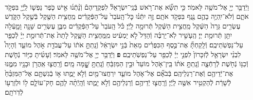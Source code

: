 \documentclass[twoside, openany, parskip=half, 11pt]{book}
\begin{document}
\begin{footnotesize}
\begin{multicols}{2}
\\
וַיְֿדַבֵּ֥ר יְיָ֖ אֶל־מֹשֶׁ֥ה לֵּאמֹֽר׃ כִּ֣י תִשָּׂ֞א אֶת־רֹ֥אשׁ בְּֿנֵֽי־יִשְׂרָאֵל֘ לִפְקֻֽדֵיהֶם֒ וְֿנָ֨תְֿנ֜וּ אִ֣ישׁ כֹּ֧פֶר נַפְשׁ֛וֹ לַֽיְֿיָ֖ בִּפְקֹ֣ד אֹתָ֑ם וְֿלֹא־יִֽהְיֶ֥ה בָהֶ֛ם נֶ֖גֶף בִּפְקֹ֥ד אֹתָֽם׃ זֶ֣ה יִתְּֿנ֗וּ כׇּל־הָֽעֹבֵר֙ עַל־הַפְּֿקֻדִ֔ים מַֽחֲצִ֥ית הַשֶּׁ֖קֶל בְּֿשֶׁ֣קֶל הַקֹּ֑דֶשׁ עֶשְׂרִ֤ים גֵּרָה֙ הַשֶּׁ֔קֶל מַֽחֲצִ֣ית הַשֶּׁ֔קֶל תְּֿרוּמָ֖ה לַֽיְֿיָ׃  כֹּ֗ל הָֽעֹבֵר֙ עַל־הַפְּֿקֻדִ֔ים מִבֶּ֛ן עֶשְׂרִ֥ים שָׁנָ֖ה וָמָ֑עְֿלָה יִתֵּ֖ן תְּֿרוּמַ֥ת יְיָ׃ הֶֽעָשִׁ֣יר לֹֽא־יַרְבֶּ֗ה וְֿהַדַּל֙ לֹ֣א יַמְעִ֔יט מִֽמַּֽחֲצִ֖ית הַשָּׁ֑קֶל לָתֵת֙ אֶת־תְּֿרוּמַ֣ת יְיָ֔ לְֿכַפֵּ֖ר עַל־נַפְשֹֽׁתֵיכֶֽם׃ וְֿלָֽקַחְתָּ֞ אֶת־כֶּ֣סֶף הַכִּפֻּרִ֗ים מֵאֵת֙ בְּֿנֵ֣י יִשְׂרָאֵ֔ל וְֿנָֽתַתָּ֣ אֹת֔וֹ עַל־עֲבֹדַ֖ת אֹ֣הֶל מוֹעֵ֑ד וְֿהָיָה֩ לִבְנֵ֨י יִשְׂרָאֵ֤ל לְֿזִכָּרוֹן֙ לִפְנֵ֣י יְיָ֔ לְֿכַפֵּ֖ר עַל־נַפְשֹֽׁתֵיכֶֽם׃ \textbf{פ}
וַיְֿדַבֵּ֥ר יְיָ֖ אֶל־מֹשֶׁ֥ה לֵּאמֹֽר׃ וְֿעָשִׂ֜יתָ כִּיּ֥וֹר נְֿחֹ֛שֶׁת וְֿכַנּ֥וֹ נְֿחֹ֖שֶׁת לְֿרָחְֿצָ֑ה וְֿנָֽתַתָּ֣ אֹת֗וֹ בֵּֽין־אֹ֤הֶל מוֹעֵד֙ וּבֵ֣ין הַמִּזְבֵּ֔חַ וְֿנָֽתַתָּ֥ שׇׇׇָׁ֖מָּה מָֽיִם׃ וְֿרָֽחֲצ֛וּ אַֽהֲרֹ֥ן וּבָנָ֖יו מִמֶּ֑נּוּ אֶת־יְֿדֵיהֶ֖ם וְֿאֶת־רַגְלֵיהֶֽם׃ בְּֿבֹאָ֞ם אֶל־אֹ֧הֶל מוֹעֵ֛ד יִרְחֲצוּ־מַ֖יִם וְֿלֹ֣א יָמֻ֑תוּ א֣וֹ בְֿגִשְׁתָּ֤ם אֶל־הַמִּזְבֵּ֨חַ֙ לְֿשָׁרֵ֔ת לְֿהַקְטִ֥יר אִשֶּׁ֖ה לַֽיְֿיָ׃ וְֿרָֽחֲצ֛וּ יְֿדֵיהֶ֥ם וְֿרַגְלֵיהֶ֖ם וְֿלֹ֣א יָמֻ֑תוּ וְֿהָֽיְֿתָ֨ה לָהֶ֧ם חָק־עוֹלָ֛ם ל֥וֹ וּלְזַרְע֖וֹ לְֿדֹֽרֹתָֽם׃


\end{multicols}
\end{footnotesize}
\end{document}
